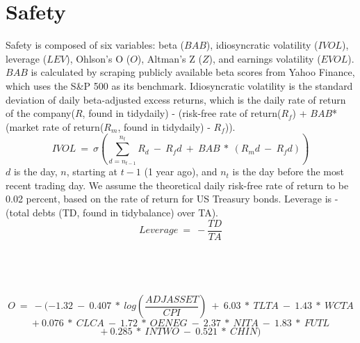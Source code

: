 \documentclass[12pt]{article}
\begin{document}
\section*{Safety}
Safety is composed of six variables: beta ($BAB$), idiosyncratic volatility ($IVOL$), leverage ($LEV$), Ohlson's O ($O$), Altman's Z ($Z$), and earnings volatility ($EVOL$). $BAB$ is calculated by scraping publicly available beta scores from Yahoo Finance, which uses the S\&P 500 as its benchmark. Idiosyncratic volatility is the standard deviation of daily beta-adjusted excess returns, which is the daily rate of return of the company($R$, found in tidydaily) - (risk-free rate of return($R_f$) + $BAB$*(market rate of return($R_m$, found in tidydaily) - $R_f$)). $$IVOL \ = \ \sigma(\sum_{d=n_{t-1}}^{n_t}R_d \ - \ R_fd \ + \ BAB \ * \ (R_md \ - \ R_fd))$$ $d$ is the day, $n$, starting at $t-1$ (1 year ago), and $n_t$ is the day before the most recent trading day. We assume the theoretical daily risk-free rate of return to be 0.02 percent, based on the rate of return for US Treasury bonds. Leverage is -(total debts (TD, found in tidybalance) over TA). $$Leverage \ = \ -\frac{TD}{TA}$$ 
\\
\\
\\
\\
$$ O \ = \ -(-1.32 \ - \ 0.407 \ * \ log(\frac{ADJASSET}{CPI}) \ + \ 6.03 \ * \ TLTA \ - \ 1.43 \ * \ WCTA$$
$$ + \ 0.076 \ * \ CLCA \ - \ 1.72 \ * \ OENEG \ - \ 2.37 \ * \ NITA \ - \ 1.83 \ * \ FUTL$$
$$ + \ 0.285 \ * \ INTWO \ - \ 0.521 \ * \ CHIN)$$ 
\end{document}
